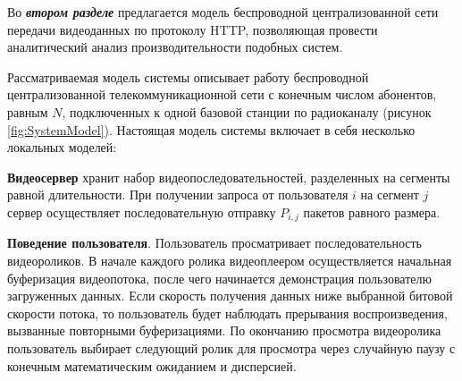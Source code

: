 

Во \textbf{\textit{втором разделе}} предлагается модель беспроводной централизованной сети передачи видеоданных по протоколу HTTP, позволяющая провести аналитический анализ производительности подобных систем.

Рассматриваемая модель системы описывает работу беспроводной централизованной телекоммуникационной сети с конечным числом абонентов, равным $N$, подключенных к одной базовой станции по радиоканалу (рисунок \ref{fig:SystemModel}). Настоящая модель системы включает в себя несколько локальных моделей:

\textbf{Видеосервер} хранит набор видеопоследовательностей, разделенных на сегменты равной длительности. При получении запроса от пользователя $i$ на сегмент $j$ сервер осуществляет последовательную отправку $P_{i,j}$ пакетов равного размера.

\textbf{Поведение пользователя}. Пользователь просматривает последовательность видеороликов. В начале каждого ролика видеоплеером осуществляется начальная буферизация видеопотока, после чего начинается демонстрация пользователю загруженных данных. Если скорость получения данных ниже выбранной битовой скорости потока, то пользователь будет наблюдать прерывания воспроизведения, вызванные повторными буферизациями. По окончанию просмотра видеоролика пользователь выбирает следующий ролик для просмотра через случайную паузу с конечным математическим ожиданием и дисперсией.


